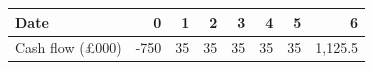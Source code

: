 \begin{tabular}{lrrrrrrr}\toprule
Date & 0 & 1 & 2 & 3 & 4 & 5 & 6\\\midrule
Cash flow (£000) & -750 & 35 & 35 & 35 & 35 & 35 & 1,125.5\\
\bottomrule\end{tabular}
